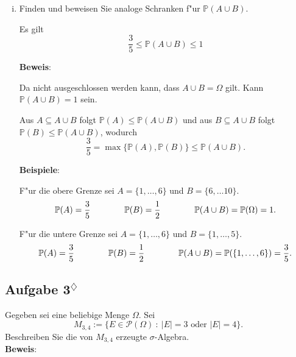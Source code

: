 \documentclass[11pt,a4paper,ngerman]{article}
\newcommand{\set}[1]{ \{ #1 \}}
\newcommand{\Prob}{\mathbb{P}}
\newcommand{\Pot}{\mathcal{P}}
\newcommand{\abs}[1]{ |#1|}
\newcommand{\marcel}{$^\diamondsuit$}
\begin{document}
\begin{enumerate}[(i)]
  \item Finden und beweisen Sie analoge Schranken f"ur $\Prob(A \cup B)$.

    Es gilt \[
      \dfrac{3}{5} \le \Prob(A \cup B) \le 1
    \]

    \textbf{Beweis}:

    Da nicht ausgeschlossen werden kann, dass $A \cup B = \Omega$ gilt. Kann
    $\Prob(A\cup B) = 1$ sein.

    Aus $A \subseteq A\cup B$ folgt $\Prob(A) \le \Prob(A\cup B)$ und aus
    $B \subseteq A\cup B$ folgt $\Prob(B) \le \Prob(A\cup B)$, wodurch \[
      \dfrac{3}{5} = \max\set{\Prob(A), \Prob(B)} \le \Prob(A\cup B).
    \]

    \textbf{Beispiele}:

    F"ur die obere Grenze sei $A = \set{1,\ldots,6}$ und
    $B = \set{6, \ldots 10}$. \[
      \Prob(A) = \dfrac{3}{5} \\ \qquad\qquad
      \Prob(B) = \dfrac{1}{2} \\ \qquad\qquad
      \Prob(A\cup B) = \Prob(\Omega) = 1.
    \]

    F"ur die untere Grenze sei $A = \set{1,\ldots,6}$ und
    $B = \set{1,\ldots, 5}$. \[
      \Prob(A) = \dfrac{3}{5} \\ \qquad\qquad
      \Prob(B) = \dfrac{1}{2} \\ \qquad\qquad
      \Prob(A\cup B) = \Prob(\set{1,\ldots,6}) = \dfrac{3}{5}.
    \]
\end{enumerate}

\subsection*{Aufgabe 3\marcel}

\newcommand{\SetM}{M_{3,4}}

Gegeben sei eine beliebige Menge $\Omega$. Sei \[
  \SetM := \set{E \in \Pot(\Omega)\ :\ \abs{E} = 3 \mbox{ oder } \abs{E} = 4}.
\]
Beschreiben Sie die von $\SetM$ erzeugte $\sigma$-Algebra.\\

\textbf{Beweis}:
\end{document}

